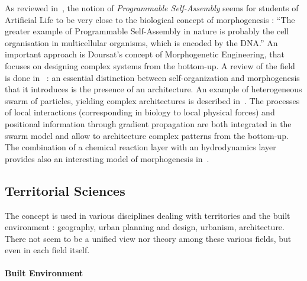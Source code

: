 \documentclass[fleqn,10pt]{wlscirep}
\begin{document}
As reviewed in~\cite{crosato2014self}, the notion of \emph{Programmable Self-Assembly} seems for students of Artificial Life to be very close to the biological concept of morphogenesis : ``The greater example of Programmable Self-Assembly in nature is probably the cell organisation in multicellular organisms, which is encoded by the DNA.'' An important approach is Doursat's concept of Morphogenetic Engineering, that focuses on designing complex systems from the bottom-up. A review of the field is done in~\cite{doursat2013review} : an essential distinction between self-organization and morphogenesis that it introduces is the presence of an architecture. An example of heterogeneous swarm of particles, yielding complex architectures is described in~\cite{doursat2008programmable}. The processes of local interactions (corresponding in biology to local physical forces) and positional information through gradient propagation are both integrated in the swarm model and allow to architecture complex patterns from the bottom-up. The combination of a chemical reaction layer with an hydrodynamics layer provides also an interesting model of morphogenesis in~\cite{cussat2012synthesis}.




\subsection*{Territorial Sciences}

The concept is used in various disciplines dealing with territories and the built environment : geography, urban planning and design, urbanism, architecture. There not seem to be a unified view nor theory among these various fields, but even in each field itself.

\paragraph{Built Environment}
\end{document}
